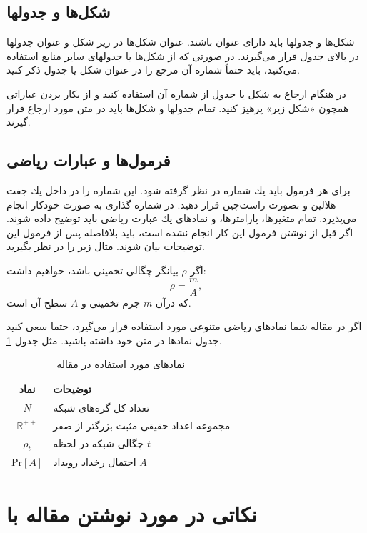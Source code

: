 \documentclass{CSICC}
\begin{document}
\subsection{شكل‌ها و جدول­ها}
شكل‌ها و جدول­ها باید دارای عنوان باشند. عنوان شكل‌ها در زیر شكل و عنوان جدول­ها در بالای جدول قرار می‌گیرند. در صورتی كه از شكل‌ها یا جدول­های سایر منابع استفاده می‌كنید، باید حتماً شماره آن مرجع را در عنوان شكل یا جدول ذكر كنید.

در هنگام ارجاع به شكل یا جدول از شماره آن استفاده كنید و از بكار بردن عباراتی همچون «شكل زیر» پرهیز كنید. تمام جدول­ها و شكل‌ها باید در متن مورد ارجاع قرار گیرند. 


\subsection{ فرمول‌ها و عبارات ریاضی}
برای هر فرمول باید یك شماره در نظر گرفته شود. این شماره را در داخل یك جفت هلالین و بصورت راست‌چین قرار دهید.  در   \lr{\LaTeX}  شماره گذاری به صورت خودکار انجام می‌پذیرد. تمام متغیرها، پارامترها، و نمادهای یك عبارت ریاضی باید توضیح داده شوند. اگر قبل از نوشتن فرمول این كار انجام نشده است، باید بلافاصله پس از فرمول این توضیحات بیان شوند. مثال زیر را در نظر بگیرید.

اگر $\rho$ بیانگر چگالی تخمینی باشد، خواهیم داشت:
\begin{equation}
\rho = \frac{m}{A},
\end{equation}
كه درآن  $m$ جرم تخمینی و $A$ سطح آن است. 

اگر در مقاله شما نمادهای ریاضی متنوعی مورد استفاده قرار می‌گیرد، حتما سعی کنید جدول نمادها در متن خود داشته باشید. مثل جدول \ref{tab:symbols}.
\begin{table}[H]
\centering
\caption{نمادهای مورد استفاده در  مقاله}
\label{tab:symbols}
\begin{tabular}{cp{6cm}}\hline
نماد & توضیحات
\\\hline
$N$ &
تعداد کل گره‌های شبکه
\\
$\mathbb{R}^{++}$ &
مجموعه اعداد حقیقی مثبت بزرگتر از صفر
\\
$\rho_{t}$ &
چگالی شبکه در لحظه $t$
\\
$\mathrm{Pr}[A]$ &
احتمال رخداد رویداد $A$
\\
\hline
\end{tabular}
\end{table}







\section{نکاتی در مورد نوشتن مقاله با \lr{\LaTeX}}
\end{document}
